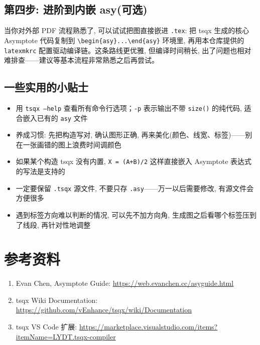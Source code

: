\documentclass[11pt,oneside]{ctexbook}
\begin{document}
\section{第四步: 进阶到内嵌 asy(可选)}
当你对外部 PDF 流程熟悉了, 可以试试把图直接嵌进 \texttt{.tex}: 把 tsqx 生成的核心 Asymptote 代码复制到 \texttt{\textbackslash begin\{asy\}...\textbackslash end\{asy\}} 环境里, 再用本仓库提供的 \texttt{latexmkrc} 配置驱动编译链。这条路线更优雅, 但编译时间稍长, 出了问题也相对难排查——建议等基本流程非常熟悉之后再尝试。

\section{一些实用的小贴士}
\begin{itemize}
	\item 用 \texttt{tsqx --help} 查看所有命令行选项；\texttt{-p} 表示输出不带 \texttt{size()} 的纯代码, 适合嵌入已有的 \texttt{asy} 文件
	\item 养成习惯: 先把构造写对, 确认图形正确, 再来美化(颜色、线宽、标签)——别在一张画错的图上浪费时间调颜色
	\item 如果某个构造 tsqx 没有内置, \texttt{X = (A+B)/2} 这样直接嵌入 Asymptote 表达式的写法是支持的
	\item 一定要保留 \texttt{.tsqx} 源文件, 不要只存 \texttt{.asy}——万一以后需要修改, 有源文件会方便很多
	\item 遇到标签方向难以判断的情况, 可以先不加方向角, 生成图之后看哪个标签压到了线段, 再针对性地调整
\end{itemize}

\backmatter
\chapter*{参考资料}
\small
\begin{enumerate}
	\item Evan Chen, Asymptote Guide:
	      \href{https://web.evanchen.cc/asyguide.html}{https://web.evanchen.cc/asyguide.html}
	\item tsqx Wiki Documentation:
	      \href{https://github.com/vEnhance/tsqx/wiki/Documentation}{https://github.com/vEnhance/tsqx/wiki/Documentation}
	\item tsqx VS Code 扩展:
	      \href{https://marketplace.visualstudio.com/items?itemName=LYDT.tsqx-compiler}{https://marketplace.visualstudio.com/items?itemName=LYDT.tsqx-compiler}
\end{enumerate}
\end{document}
